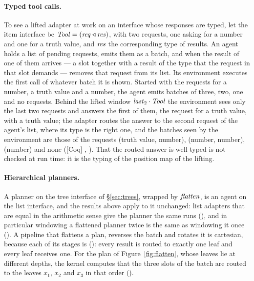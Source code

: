 \documentclass{fundam}
\begin{document}
\paragraph{Typed tool calls.}  To see a lifted adapter at work on an interface whose
responses are typed, let the item interface be
$\mathit{Tool} = (\mathit{req} \triangleleft \mathit{res})$, with two requests, one asking for a
number and one for a truth value, and $\mathit{res}$ the corresponding type of results.  An
agent holds a list of pending requests, emits them as a batch, and when the result of one
of them arrives --- a slot together with a result of the type that the request in that
slot demands --- removes that request from its list.  Its environment executes the first
call of whatever batch it is shown.  Started with the requests for a number, a truth
value and a number, the agent emits batches of three, two, one and no requests.  Behind
the lifted window $\mathit{last}_2 \cdot \mathit{Tool}$ the environment sees only the last two
requests and answers the first of them, the request for a truth value, with a truth
value; the adapter routes the answer to the second request of the agent's list, where
its type is the right one, and the batches seen by the environment are those of the
requests (truth value, number), (number, number), (number) and none (\textsf{[Coq]}
, ).  That the routed answer is well typed is
not checked at run time: it is the typing of the position map of the lifting.

\paragraph{Hierarchical planners.}  A planner on the tree interface of
\S\ref{sec:trees}, wrapped by $\mathit{flatten}$, is an agent on the list interface, and the
results above apply to it unchanged: list adapters that are equal in the arithmetic
sense give the planner the same runs (), and in particular
windowing a flattened planner twice is the same as windowing it once
().  A pipeline that flattens a plan, reverses the batch and
rotates it is cartesian, because each of its stages is ():
every result is routed to exactly one leaf and every leaf receives one.  For the plan
of Figure~\ref{fig:flatten}, whose leaves lie at different depths, the kernel computes
that the three slots of the batch are routed to the leaves $x_1$, $x_2$ and $x_3$ in
that order ().
\end{document}
